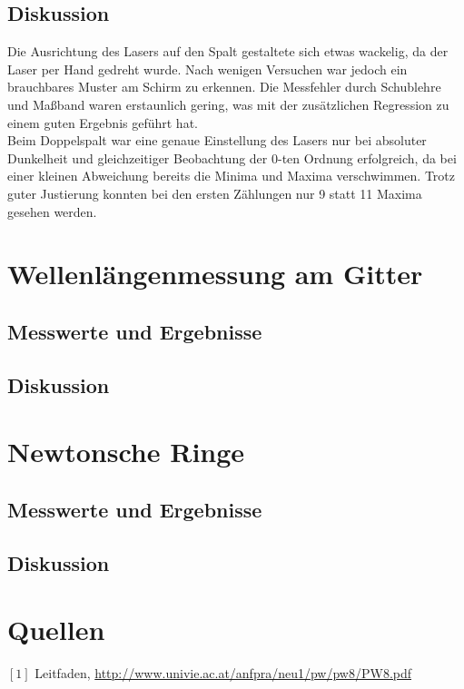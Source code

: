 \documentclass[12pt,a4paper]{article}
\begin{document}
\begin{multicols}{2}
\subsection{Diskussion}
Die Ausrichtung des Lasers auf den Spalt gestaltete sich etwas wackelig, da der Laser per Hand gedreht wurde. Nach wenigen Versuchen war jedoch ein brauchbares Muster am Schirm zu erkennen. Die Messfehler durch Schublehre und Maßband waren erstaunlich gering, was mit der zusätzlichen Regression zu einem guten Ergebnis geführt hat.\\
Beim Doppelspalt war eine genaue Einstellung des Lasers nur bei absoluter Dunkelheit und gleichzeitiger Beobachtung der 0-ten Ordnung erfolgreich, da bei einer kleinen Abweichung bereits die Minima und Maxima verschwimmen. Trotz guter Justierung konnten bei den ersten Zählungen nur 9 statt 11 Maxima gesehen werden.  

\section{Wellenlängenmessung am Gitter}



\subsection{Messwerte und Ergebnisse}




\subsection{Diskussion}


\section{Newtonsche Ringe}


\subsection{Messwerte und Ergebnisse}



\subsection{Diskussion}

\section{Quellen}
$[1]$ Leitfaden, \url{http://www.univie.ac.at/anfpra/neu1/pw/pw8/PW8.pdf}\\

\end{multicols}
\end{document}
